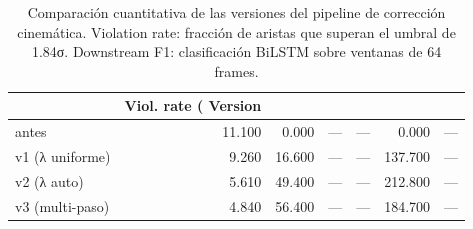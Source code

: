 \begin{table}
\caption{Comparación cuantitativa de las versiones del pipeline de corrección cinemática. Violation rate: fracción de aristas que superan el umbral de 1.84σ. Downstream F1: clasificación BiLSTM sobre ventanas de 64 frames.}
\label{tab:skeleton_results}
\begin{tabular}{lrrrrrl}
\toprule
 & Viol. rate (%
Version &  &  &  &  &  &  \\
\midrule
antes & 11.100 & 0.000 & — & — & 0.000 & — \\
v1 (λ uniforme) & 9.260 & 16.600 & — & — & 137.700 & — \\
v2 (λ auto) & 5.610 & 49.400 & — & — & 212.800 & — \\
v3 (multi-paso) & 4.840 & 56.400 & — & — & 184.700 & — \\
\bottomrule
\end{tabular}
\end{table}
